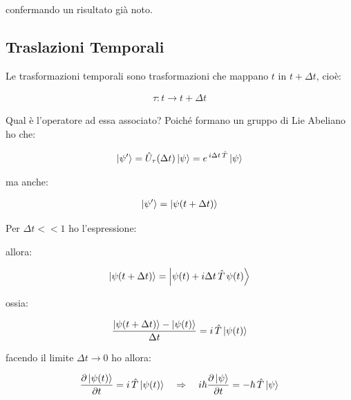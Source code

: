 	confermando un risultato già noto.	

\subsection{Traslazioni Temporali}

	Le trasformazioni temporali sono trasformazioni che mappano $t$ in $t + \Delta t$, cioè:
	
\begin{align*}
	\tau : t \to t + \Delta t
\end{align*}

	Qual è l'operatore ad essa associato? Poiché formano un gruppo di Lie Abeliano ho che:
	
\begin{align*}
	\ket{\psi'} = \hat{U}_{\tau} \qty(\Delta t) \ket{\psi} = e^{\, i \Delta t \, \hat{T}} \ket{\psi}
\end{align*}

	ma anche:
	
\begin{align*}
	\ket{\psi'} = \ket{\psi\qty(t + \Delta t)}
\end{align*}

	Per $\Delta t << 1$ ho l'espressione:
	

	allora:
	
\begin{align*}
	\ket{\psi\qty(t + \Delta t)} =\ket{\psi\qty(t) + i \Delta t \, \hat{T} \, \psi\qty(t)}
\end{align*}

	ossia:
	
\begin{align*}
	\frac{\ket{\psi\qty(t + \Delta t)} - \ket{\psi\qty(t)}}{\Delta t} = i \, \hat{T} \ket{\psi\qty(t)}
\end{align*}

	facendo il limite $\Delta t \to 0$ ho allora:
	
\begin{align*}
	\pdv{\ket{\psi\qty(t)}}{t} = i \, \hat{T} \ket{\psi\qty(t)} \quad \Rightarrow \quad i \hbar \pdv{\ket{\psi}}{t} = - \hbar \, \hat{T} \ket{\psi}
\end{align*}

